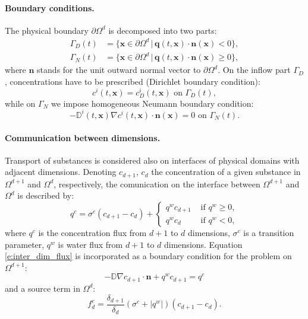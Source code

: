 \documentclass[a4paper]{article}
\def\abs#1{\lvert#1\rvert}
\def\D{{\tn D}}
\def\vc#1{\mathbf{\boldsymbol{#1}}}     %
\def\tn#1{{\mathbb{#1}}}    %
\def\where{\,|\,}
\begin{document}
\paragraph{Boundary conditions.}
The physical boundary $\partial\Omega^d$ is decomposed into two parts:
\begin{align*}
\Gamma_D(t) &= \{\vc x\in \partial\Omega^d\where \vc q(t,\vc x)\cdot\vc n(\vc x)<0\},\\
\Gamma_N(t) &= \{\vc x\in \partial\Omega^d\where \vc q(t,\vc x)\cdot\vc n(\vc x)\ge 0\},
\end{align*}
where $\vc n$ stands for the unit outward normal vector to $\partial\Omega^d$.
On the inflow part $\Gamma_D$, concentrations have to be prescribed (Dirichlet boundary condition):
$$ c^i(t,\vc x) = c^i_D(t,\vc x) \mbox{ on }\Gamma_D(t), $$
while on $\Gamma_N$ we impose homogeneous Neumann boundary condition:
$$ -\D^i(t,\vc x)\nabla c^i(t,\vc x)\cdot\vc n(\vc x) = 0 \mbox{ on }\Gamma_N(t). $$




\paragraph{Communication between dimensions.}
Transport of substances is considered also on interfaces of physical domains with adjacent dimensions.
Denoting $c_{d+1}$, $c_d$ the concentration of a given substance in $\Omega^{d+1}$ and $\Omega^d$, respectively, the comunication on the interface between $\Omega^{d+1}$ and $\Omega^d$ is described by:
\begin{equation}
  \label{e:inter_dim_flux}
  q^c = \sigma^c (c_{d+1} - c_d) + \begin{cases}q^w c_{d+1} & \mbox{ if }q^w\ge 0,\\q^w c_d & \mbox{ if }q^w<0,\end{cases}
\end{equation}
where $q^c$ is the concentration flux from $d+1$ to $d$ dimensions, $\sigma^c$ is a transition parameter, $q^w$ is water flux from $d+1$ to $d$ dimensions.
Equation \eqref{e:inter_dim_flux} is incorporated as a boundary condition for the problem on $\Omega^{d+1}$:
$$ -\D\nabla c_{d+1}\cdot\vc n + q^w c_{d+1} = q^c $$
and a source term in $\Omega^d$:
$$ f^c_d = \frac{\delta_{d+1}}{\delta_d}(\sigma^c+\abs{q^w})(c_{d+1}-c_d). $$
\end{document}
